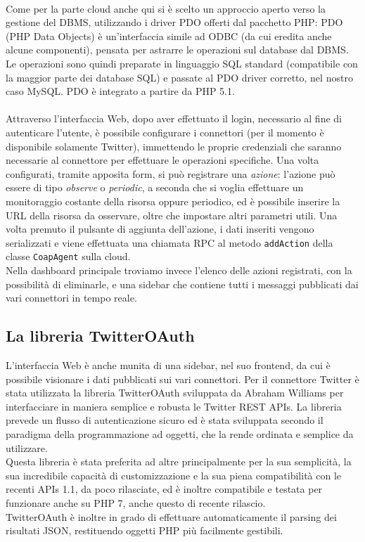 \\Come per la parte cloud anche qui si è scelto un approccio aperto verso la gestione del DBMS, utilizzando i driver PDO offerti dal pacchetto PHP: PDO (PHP Data Objects) è un'interfaccia simile ad ODBC (da cui eredita anche alcune componenti), pensata per astrarre le operazioni sul database dal DBMS. Le operazioni sono quindi preparate in linguaggio SQL standard (compatibile con la maggior parte dei database SQL) e passate al PDO driver corretto, nel nostro caso MySQL. PDO è integrato a partire da PHP 5.1.
\\\\Attraverso l'interfaccia Web, dopo aver effettuato il login, necessario al fine di autenticare l'utente, è possibile configurare i connettori (per il momento è disponibile solamente Twitter), immettendo le proprie credenziali che saranno necessarie al connettore per effettuare le operazioni specifiche. Una volta configurati, tramite apposita form, si può registrare una \textit{azione}: l'azione può essere di tipo \textit{observe} o \textit{periodic}, a seconda che si voglia effettuare un monitoraggio costante della risorsa oppure periodico, ed è possibile inserire la URL della risorsa da osservare, oltre che impostare altri parametri utili. Una volta premuto il pulsante di aggiunta dell'azione, i dati inseriti vengono serializzati e viene effettuata una chiamata RPC al metodo {\tt addAction} della classe {\tt CoapAgent} sulla cloud.
\\Nella dashboard principale troviamo invece l'elenco delle azioni registrati, con la possibilità di eliminarle, e una sidebar che contiene tutti i messaggi pubblicati dai vari connettori in tempo reale.

\subsection{La libreria TwitterOAuth}
L'interfaccia Web è anche munita di una sidebar, nel suo frontend, da cui è possibile visionare i dati pubblicati sui vari connettori. Per il connettore Twitter è stata utilizzata la libreria TwitterOAuth sviluppata da Abraham Williams per interfacciare in maniera semplice e robusta le Twitter REST APIs. La libreria prevede un flusso di autenticazione sicuro ed è stata sviluppata secondo il paradigma della programmazione ad oggetti, che la rende ordinata e semplice da utilizzare.
\\Questa libreria è stata preferita ad altre principalmente per la sua semplicità, la sua incredibile capacità di customizzazione e la sua piena compatibilità con le recenti APIs 1.1, da poco rilasciate, ed è inoltre compatibile e testata per funzionare anche su PHP 7, anche questo di recente rilascio.
\\TwitterOAuth è inoltre in grado di effettuare automaticamente il parsing dei risultati JSON, restituendo oggetti PHP più facilmente gestibili.

